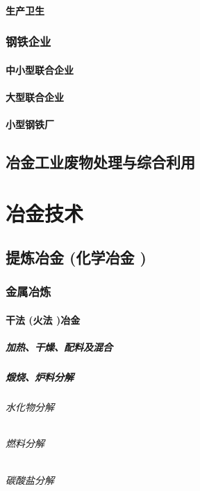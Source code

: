 \documentclass[UTF8]{../../ApplicationUniverse}
\begin{document}
        \subsubsection{生产卫生}
    \subsection{钢铁企业}
        \subsubsection{中小型联合企业}
        \subsubsection{大型联合企业}
        \subsubsection{小型钢铁厂}
\section{冶金工业废物处理与综合利用}









\chapter{冶金技术}
\section{提炼冶金 (化学冶金 )}
    \subsection{金属冶炼}
        \subsubsection{干法 (火法 )冶金}
            \paragraph{加热、干燥、配料及混合}
            \paragraph{煅烧、炉料分解}
                \subparagraph{水化物分解}
                \subparagraph{燃料分解}
                \subparagraph{碳酸盐分解}
\end{document}
